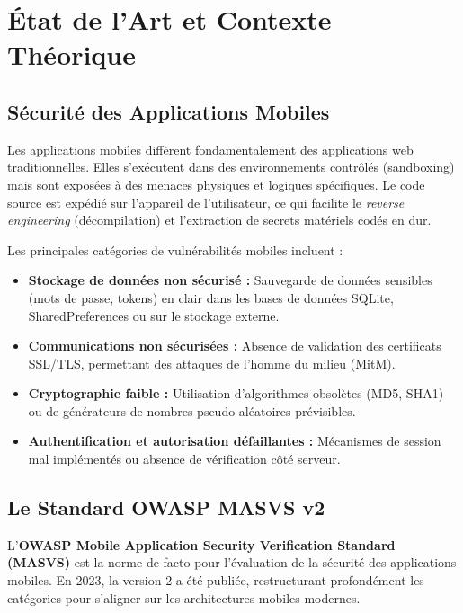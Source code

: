 \chapter{État de l'Art et Contexte Théorique}
\label{chap:etat_art}

\section{Sécurité des Applications Mobiles}
Les applications mobiles diffèrent fondamentalement des applications web traditionnelles. Elles s'exécutent dans des environnements contrôlés (sandboxing) mais sont exposées à des menaces physiques et logiques spécifiques. Le code source est expédié sur l'appareil de l'utilisateur, ce qui facilite le \textit{reverse engineering} (décompilation) et l'extraction de secrets matériels codés en dur.

Les principales catégories de vulnérabilités mobiles incluent :
\begin{itemize}[label=\textcolor{PrimaryBlue}{\faShieldAlt}]
    \item \textbf{Stockage de données non sécurisé :} Sauvegarde de données sensibles (mots de passe, tokens) en clair dans les bases de données SQLite, SharedPreferences ou sur le stockage externe.
    \item \textbf{Communications non sécurisées :} Absence de validation des certificats SSL/TLS, permettant des attaques de l'homme du milieu (MitM).
    \item \textbf{Cryptographie faible :} Utilisation d'algorithmes obsolètes (MD5, SHA1) ou de générateurs de nombres pseudo-aléatoires prévisibles.
    \item \textbf{Authentification et autorisation défaillantes :} Mécanismes de session mal implémentés ou absence de vérification côté serveur.
\end{itemize}

\section{Le Standard OWASP MASVS v2}
L'\textbf{OWASP Mobile Application Security Verification Standard (MASVS)} est la norme de facto pour l'évaluation de la sécurité des applications mobiles. En 2023, la version 2 a été publiée, restructurant profondément les catégories pour s'aligner sur les architectures mobiles modernes.


